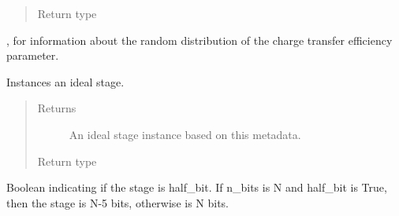 \documentclass[letterpaper,10pt,english]{sphinxmanual}
\begin{document}
\begin{fulllineitems}
\begin{fulllineitems}
\begin{quote}
\begin{description}
\item[{Return type}] \leavevmode
{\hyperref[\detokenize{gen:calib.gen.StageParameters}]{}}

\end{description}\end{quote}




{\hyperref[\detokenize{gen:calib.gen.eff_random}]{}}, for information about the random
distribution of the charge transfer efficiency parameter.



\end{fulllineitems}


\begin{fulllineitems}
\label{\detokenize{gen:calib.gen.StageMeta.generate_ideal}}
Instances an ideal stage.
\begin{quote}\begin{description}
\item[{Returns}] \leavevmode
An ideal stage instance based on this metadata.

\item[{Return type}] \leavevmode
{\hyperref[\detokenize{gen:calib.gen.StageParameters}]{}}

\end{description}\end{quote}

\end{fulllineitems}


\begin{fulllineitems}
\label{\detokenize{gen:calib.gen.StageMeta.half_bit}}
Boolean indicating if the stage is half\_bit. If n\_bits is N and
half\_bit is True, then the stage is N-5 bits, otherwise is N bits.

\end{fulllineitems}


\end{fulllineitems}
\end{document}

